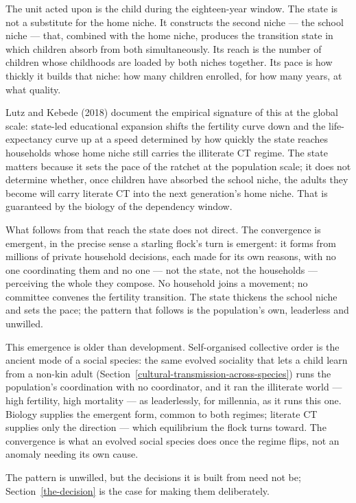 \documentclass[12pt,letterpaper]{article}
\begin{document}
The unit acted upon is the child during the eighteen-year window.
The state is not a substitute for the home niche. It constructs the
second niche --- the school niche --- that, combined with the home
niche, produces the transition state in which children absorb from
both simultaneously. Its reach is the number of children whose
childhoods are loaded by both niches together. Its pace is how
thickly it builds that niche: how many children enrolled, for how
many years, at what quality.

Lutz and Kebede (2018) document the empirical signature of this at
the global scale: state-led educational expansion shifts the
fertility curve down and the life-expectancy curve up at a speed
determined by how quickly the state reaches households whose home
niche still carries the illiterate CT regime. The state matters
because it sets the pace of the ratchet at the population scale; it
does not determine whether, once children have absorbed the school
niche, the adults they become will carry literate CT into the next
generation's home niche. That is guaranteed by the biology of the
dependency window.

What follows from that reach the state does not direct. The
convergence is emergent, in the precise sense a starling flock's turn
is emergent: it forms from millions of private household decisions,
each made for its own reasons, with no one coordinating them and
no one --- not the state, not the households --- perceiving the whole
they compose. No household joins a movement; no committee convenes
the fertility transition. The state thickens the school niche and
sets the pace; the pattern that follows is the population's own,
leaderless and unwilled.

This emergence is older than development. Self-organised collective
order is the ancient mode of a social species: the same evolved
sociality that lets a child learn from a non-kin adult
(Section~\ref{cultural-transmission-across-species}) runs the
population's coordination with no coordinator, and it ran the
illiterate world --- high fertility, high mortality --- as leaderlessly,
for millennia, as it runs this one. Biology supplies the emergent form,
common to both regimes; literate CT supplies only the direction ---
which equilibrium the flock turns toward. The convergence is what an
evolved social species does once the regime flips, not an anomaly
needing its own cause.

The pattern is unwilled, but the decisions it
is built from need not be; Section~\ref{the-decision} is the case for
making them deliberately.
\end{document}
